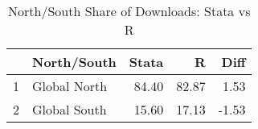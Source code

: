 \begin{table}[ht]
\centering
\begin{tabular}{rlrrr}
  \hline
 & North/South & Stata & R & Diff \\ 
  \hline
1 & Global North & 84.40 & 82.87 & 1.53 \\ 
  2 & Global South & 15.60 & 17.13 & -1.53 \\ 
   \hline
\end{tabular}
\caption{North/South Share of Downloads: Stata vs R} 
\label{tab:ns_compare}
\end{table}
